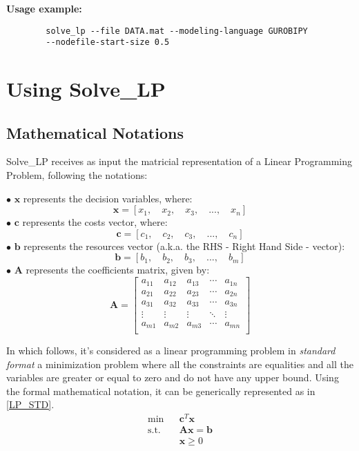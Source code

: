 \documentclass[12pt,hidelinks]{article}
\begin{document}
	\textbf{Usage example:} 
	\begin{verbatim}
		solve_lp --file DATA.mat --modeling-language GUROBIPY
		--nodefile-start-size 0.5
	\end{verbatim}

\newpage

\section{Using Solve\_LP}
\label{section:usage}
\vspace{10.5cm}
	\subsection{Mathematical Notations}
		Solve\_LP receives as input the matricial representation of a Linear Programming Problem, following the notations:

			$\bullet$ $\mathbf{x}$ represents the decision variables, where:
			$$\mathbf{x} = [x_1, \quad x_2, \quad x_3, \quad ..., \quad x_n]$$
			$\bullet$ $\mathbf{c}$ represents the costs vector, where:
			$$\mathbf{c} = [c_1, \quad c_2, \quad c_3, \quad ..., \quad c_n]$$
			$\bullet$ $\mathbf{b}$ represents the resources vector (a.k.a. the RHS - Right Hand Side - vector):
			$$\mathbf{b} = [b_1, \quad b_2, \quad b_3, \quad ..., \quad b_m]$$
			$\bullet$ $\mathbf{A}$ represents the coefficients matrix, given by:
			$$\mathbf{A} = \left[\begin{array}{ccccc}
				a_{11} & a_{12} & a_{13} & \cdots & a_{1n} \\
				a_{21} & a_{22} & a_{23} & \cdots & a_{2n} \\
				a_{31} & a_{32} & a_{33} & \cdots & a_{3n} \\
				\vdots & \vdots & \vdots & \ddots & \vdots \\
				a_{m1} & a_{m2} & a_{m3} & \cdots & a_{mn} \\
			\end{array}\right] $$				

		In which follows, it's considered as a linear programming problem in \emph{standard format} a minimization problem where all the constraints are equalities and all the variables are greater or equal to zero and do not have any upper bound. Using the formal mathematical notation, it can be generically represented as in \eqref{LP_STD}.
		\begin{equation}\label{LP_STD}
			\begin{array}{llc}
				\min                & &  \mathbf{c}^T \mathbf{x}            \\
				\operatorname{s.t.} & &  \mathbf{A}\mathbf{x} = \mathbf{b}  \\
									& &   \mathbf{x} \geqslant 0
			\end{array}
		\end{equation}
\end{document}
